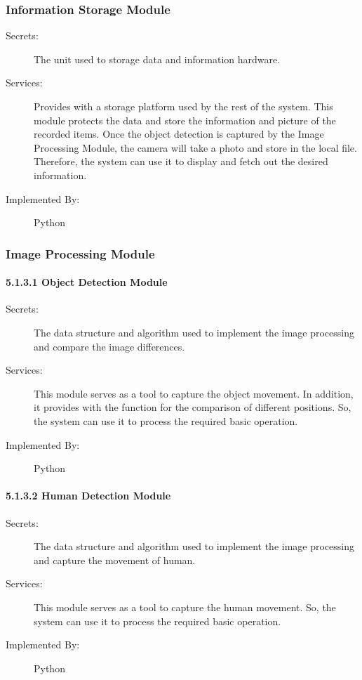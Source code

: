 \documentclass[12pt, titlepage]{article}
\begin{document}
\subsubsection{Information Storage Module}
\begin{description}
\item[Secrets:]The unit used to storage data and information
hardware.
\item[Services:]Provides with a storage platform used by the rest of the system. This module protects the data and store the information and picture of the recorded items. Once the object detection is captured by the Image Processing Module, the camera will take a photo and store in the local file. Therefore, the system can use it to display and fetch out the desired information.
\item[Implemented By:] Python
\end{description}
\subsubsection{Image Processing Module}
\paragraph{5.1.3.1	 Object Detection Module}
\begin{description}
\item[Secrets:]The data structure and algorithm used to implement the image processing and compare the image differences.
\item[Services:]This module serves as a tool to capture the object movement. In addition, it provides with the function for the comparison of different positions. So, the system can use it to process the required basic operation.
\item[Implemented By:] Python
\end{description}
\paragraph{5.1.3.2	 Human Detection Module}
\begin{description}
\item[Secrets:]The data structure and algorithm used to implement the image processing and capture the movement of human.
\item[Services:]This module serves as a tool to capture the human movement. So, the system can use it to process the required basic operation.
\item[Implemented By:] Python
\end{description}
\end{document}
